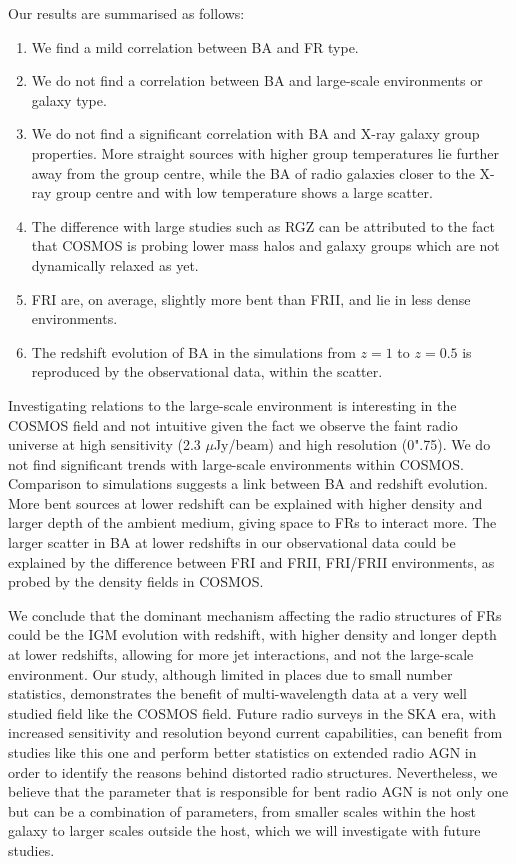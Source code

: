 \documentclass[galaxies,article,submit,moreauthors,pdftex]{Definitions/mdpi}
\begin{document}
 Our results are summarised as follows:
 \begin{enumerate}
     \item We find a mild correlation between BA and FR type.
     \item We do not find a correlation between BA and large-scale environments or galaxy type.
     \item We do not find a significant correlation with BA and X-ray galaxy group properties. More straight sources with higher group temperatures lie further away from the group centre, while the BA of radio galaxies closer to the X-ray group centre and with low temperature shows a large scatter.
     \item The difference with large studies such as RGZ can be attributed to the fact that COSMOS is probing lower mass halos and galaxy groups which are not dynamically relaxed as yet.
     \item FRI are, on average, slightly more bent than FRII, and lie in less dense environments.
     \item The redshift evolution of BA in the simulations from $z = 1$ to $z = 0.5$ is reproduced by the observational data, within the scatter.
 \end{enumerate}

 Investigating relations to the large-scale environment is interesting in the COSMOS field and not intuitive given the fact we observe the faint radio universe at high sensitivity (2.3 $\mu$Jy/beam) and high resolution (0".75). We do not find significant trends with large-scale environments within COSMOS. Comparison to simulations suggests a link between BA and redshift evolution. More bent sources at lower redshift can be explained with higher density and larger depth of the ambient medium, giving space to FRs to interact more. The larger scatter in BA at lower redshifts in our observational data could be explained by the difference between FRI and FRII, FRI/FRII environments, as probed by the density fields in COSMOS. 
 
 We conclude that the dominant mechanism affecting the radio structures of FRs could be the IGM evolution with redshift, with higher density and longer depth at lower redshifts, allowing for more jet interactions, and not the large-scale environment. Our study, although limited in places due to small number statistics,  demonstrates the benefit of multi-wavelength data at a very well studied field like the COSMOS field. Future radio surveys in the SKA era, with increased sensitivity and resolution beyond current capabilities, can benefit from studies like this one and perform better statistics on extended radio AGN in order to identify the reasons behind distorted radio structures. Nevertheless, we believe that the parameter that is responsible for bent radio AGN is not only one but can be a combination of parameters, from smaller scales within the host galaxy to larger scales outside the host, which we will investigate with future studies. 
\end{document}
